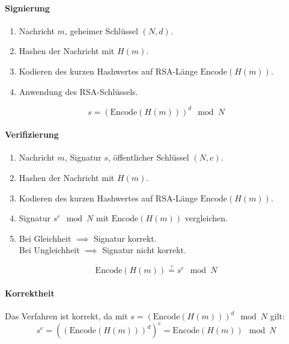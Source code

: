             \paragraph{Signierung}
                \begin{enumerate}
                	\item[] Nachricht \(m\), geheimer Schlüssel \((N, d)\).
                	\item Hashen der Nachricht mit \(H(m)\).
                	\item Kodieren des kurzen Hashwertes auf RSA-Länge \(\text{Encode}(H(m))\).
                	\item Anwendung des RSA-Schlüssels.
                \end{enumerate}
                \begin{equation*}
	                s = (\text{Encode}(H(m))) ^ d \mod N
                \end{equation*}
            
            \paragraph{Verifizierung}
                \begin{enumerate}
                	\item[] Nachricht \(m\), Signatur \(s\), öffentlicher Schlüssel \((N, e)\).
                	\item Hashen der Nachricht mit \(H(m)\).
                	\item Kodieren des kurzen Hashwertes auf RSA-Länge \(\text{Encode}(H(m))\).
                	\item Signatur \( s^e \mod N \) mit \(\text{Encode}(H(m))\) vergleichen.
                	\item Bei Gleichheit \(\implies\) Signatur korrekt. \\
                	      Bei Ungleichheit \(\implies\) Signatur nicht korrekt.
                \end{enumerate}
                \begin{equation*}
	                \text{Encode}(H(m)) \overset{?}{=} s ^ e \mod N
                \end{equation*}
            
            \paragraph{Korrektheit}
                Das Verfahren ist korrekt, da mit \( s = (\text{Encode}(H(m))) ^ d \mod N \) gilt:
                \begin{equation*}
	                s^e = ((\text{Encode}(H(m))) ^ d) ^ e = \text{Encode}(H(m)) \mod N
                \end{equation*}

